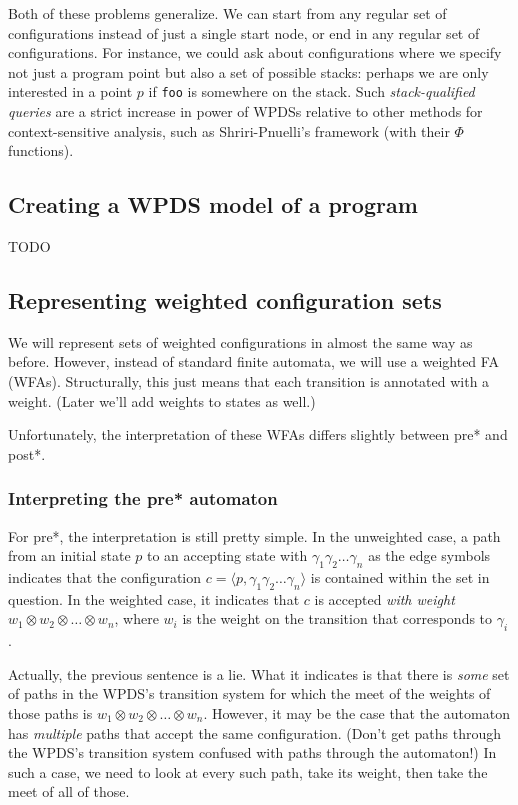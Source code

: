 \documentclass{article}
\newcommand{\Code}[1]{\texttt{#1}}
\newcommand{\Config}[2]{\ensuremath{\langle #1, #2 \rangle}}
\newcommand{\extend}{\otimes}
\begin{document}
Both of these problems generalize. We can start from any regular set
of configurations instead of just a single start node, or end in any
regular set of configurations. For instance, we could ask about
configurations where we specify not just a program point but also a
set of possible stacks: perhaps we are only interested in a point $p$
if \Code{foo} is somewhere on the stack.  Such \emph{stack-qualified
  queries} are a strict increase in power of WPDSs relative to other
methods for context-sensitive analysis, such as Shriri-Pnuelli's
framework (with their $\Phi$ functions).


\subsection{Creating a WPDS model of a program}

TODO


\subsection{Representing weighted configuration sets}

We will represent sets of weighted configurations in almost the same
way as before. However, instead of standard finite automata, we will
use a weighted FA (WFAs). Structurally, this just means that each
transition is annotated with a weight. (Later we'll add weights to
states as well.)

Unfortunately, the interpretation of these WFAs differs slightly
between pre* and post*.

\subsubsection{Interpreting the pre* automaton}
For pre*, the interpretation is still pretty simple. In the unweighted
case, a path from an initial state $p$ to an accepting state with
$\gamma_1\gamma_2\dots\gamma_n$ as the edge symbols indicates that the
configuration $c = \Config{p}{\gamma_1\gamma_2\dots\gamma_n}$ is
contained within the set in question. In the weighted case, it
indicates that $c$ is accepted \emph{with weight} $w_1 \extend w_2
\extend \dots \extend w_n$, where $w_i$ is the weight on the
transition that corresponds to $\gamma_i$.

Actually, the previous sentence is a lie. What it indicates is that
there is \emph{some} set of paths in the WPDS's transition system for
which the meet of the weights of those paths is $w_1 \extend w_2
\extend \dots \extend w_n$. However, it may be the case that the
automaton has \emph{multiple} paths that accept the same
configuration. (Don't get paths through the WPDS's transition system
confused with paths through the automaton!) In such a case, we need to
look at every such path, take its weight, then take the meet of all of
those.
\end{document}
